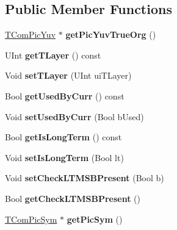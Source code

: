 \subsection*{Public Member Functions}
\begin{DoxyCompactItemize}
\item 
\mbox{\label{class_t_com_pic_a202893da9e9e1b336dfde7835026ff0e}} 
\hyperlink{class_t_com_pic_yuv}{T\+Com\+Pic\+Yuv} $\ast$ {\bfseries get\+Pic\+Yuv\+True\+Org} ()
\item 
\mbox{\label{class_t_com_pic_afbabdcbf3f942f44fbab401225a34a84}} 
U\+Int {\bfseries get\+T\+Layer} () const
\item 
\mbox{\label{class_t_com_pic_af4f7581ffadc4c8b29729b0f9dd2d5c9}} 
Void {\bfseries set\+T\+Layer} (U\+Int ui\+T\+Layer)
\item 
\mbox{\label{class_t_com_pic_a3f44e12545139a37f9a1adec71af2cb9}} 
Bool {\bfseries get\+Used\+By\+Curr} () const
\item 
\mbox{\label{class_t_com_pic_a61e359d404790db00ce76d13dd2a9cd2}} 
Void {\bfseries set\+Used\+By\+Curr} (Bool b\+Used)
\item 
\mbox{\label{class_t_com_pic_a293d09f377d3df60a6747f7bfcfacbc7}} 
Bool {\bfseries get\+Is\+Long\+Term} () const
\item 
\mbox{\label{class_t_com_pic_a1e812ffaaf871beea3839c3a45e01ecd}} 
Void {\bfseries set\+Is\+Long\+Term} (Bool lt)
\item 
\mbox{\label{class_t_com_pic_a9d514f519ab9a3eb20a0781f910950ab}} 
Void {\bfseries set\+Check\+L\+T\+M\+S\+B\+Present} (Bool b)
\item 
\mbox{\label{class_t_com_pic_a97095f1cacb56d072cf65ea23d7ae859}} 
Bool {\bfseries get\+Check\+L\+T\+M\+S\+B\+Present} ()
\item 
\mbox{\label{class_t_com_pic_a301a333b37789c069c8632b68b602ac5}} 
\hyperlink{class_t_com_pic_sym}{T\+Com\+Pic\+Sym} $\ast$ {\bfseries get\+Pic\+Sym} ()

\end{DoxyCompactItemize}
